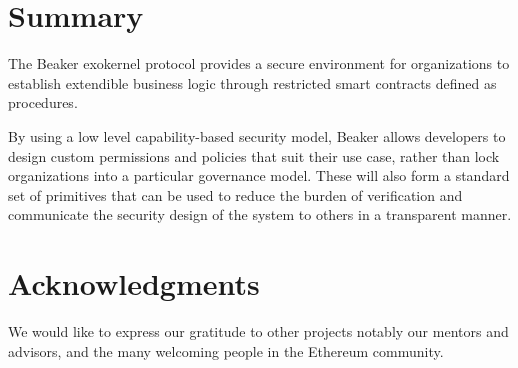 \documentclass[english,a4paper]{article}
\begin{document}
\section{Summary}\label{summary}

The Beaker exokernel protocol provides a secure environment for
organizations to establish extendible business logic through restricted
smart contracts defined as procedures.

By using a low level capability-based security model, Beaker allows
developers to design custom permissions and policies that suit their use
case, rather than lock organizations into a particular governance model.
These will also form a standard set of primitives that can be used to
reduce the burden of verification and communicate the security design of
the system to others in a transparent manner.

\section{Acknowledgments}\label{acknowledgments}

We would like to express our gratitude to other projects notably our
mentors and advisors, and the many welcoming people in the Ethereum
community.
\end{document}
